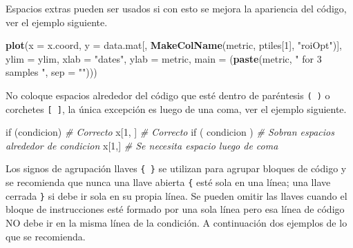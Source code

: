 \documentclass[10pt,]{krantz}
\makeatletter
\newenvironment{Shaded}{\begin{snugshade}}{\end{snugshade}}
\newcommand{\KeywordTok}[1]{\textcolor[rgb]{0.13,0.29,0.53}{\textbf{{#1}}}}
\newcommand{\DataTypeTok}[1]{\textcolor[rgb]{0.13,0.29,0.53}{{#1}}}
\newcommand{\DecValTok}[1]{\textcolor[rgb]{0.00,0.00,0.81}{{#1}}}
\newcommand{\StringTok}[1]{\textcolor[rgb]{0.31,0.60,0.02}{{#1}}}
\newcommand{\CommentTok}[1]{\textcolor[rgb]{0.56,0.35,0.01}{\textit{{#1}}}}
\newcommand{\NormalTok}[1]{{#1}}
\newenvironment{kframe}{%
\medskip{}
\setlength{\fboxsep}{.8em}
 \def\at@end@of@kframe{}%
 \ifinner\ifhmode%
  \def\at@end@of@kframe{\end{minipage}}%
  \begin{minipage}{\columnwidth}%
 \fi\fi%
 \def\FrameCommand##1{\hskip\@totalleftmargin \hskip-\fboxsep
 \colorbox{shadecolor}{##1}\hskip-\fboxsep
     \hskip-\linewidth \hskip-\@totalleftmargin \hskip\columnwidth}%
 \MakeFramed {\advance\hsize-\width
   \@totalleftmargin\z@ \linewidth\hsize
   \@setminipage}}%
 {\par\unskip\endMakeFramed%
 \at@end@of@kframe}
\renewenvironment{Shaded}{\begin{kframe}}{\end{kframe}}
\makeatother
\begin{document}
Espacios extras pueden ser usados si con esto se mejora la apariencia
del código, ver el ejemplo siguiente.

\begin{Shaded}
\begin{Highlighting}[]
\KeywordTok{plot}\NormalTok{(}\DataTypeTok{x    =} \NormalTok{x.coord,}
     \DataTypeTok{y    =} \NormalTok{data.mat[, }\KeywordTok{MakeColName}\NormalTok{(metric, ptiles[}\DecValTok{1}\NormalTok{], }\StringTok{"roiOpt"}\NormalTok{)],}
     \DataTypeTok{ylim =} \NormalTok{ylim,}
     \DataTypeTok{xlab =} \StringTok{"dates"}\NormalTok{,}
     \DataTypeTok{ylab =} \NormalTok{metric,}
     \DataTypeTok{main =} \NormalTok{(}\KeywordTok{paste}\NormalTok{(metric, }\StringTok{" for 3 samples "}\NormalTok{, }\DataTypeTok{sep =} \StringTok{""}\NormalTok{)))}
\end{Highlighting}
\end{Shaded}

No coloque espacios alrededor del código que esté dentro de paréntesis
\texttt{(\ )} o corchetes \texttt{{[}\ {]}}, la única excepción es luego
de una coma, ver el ejemplo siguiente.

\begin{Shaded}
\begin{Highlighting}[]
\NormalTok{if (condicion)    }\CommentTok{# Correcto }
\NormalTok{x[}\DecValTok{1}\NormalTok{, ]            }\CommentTok{# Correcto}
\NormalTok{if ( condicion )  }\CommentTok{# Sobran espacios alrededor de condicion}
\NormalTok{x[}\DecValTok{1}\NormalTok{,]             }\CommentTok{# Se necesita espacio luego de coma}
\end{Highlighting}
\end{Shaded}

Los signos de agrupación llaves \texttt{\{\ \}} se utilizan para agrupar
bloques de código y se recomienda que nunca una llave abierta
\texttt{\{} esté sola en una línea; una llave cerrada \texttt{\}} si
debe ir sola en su propia línea. Se pueden omitir las llaves cuando el
bloque de instrucciones esté formado por una sola línea pero esa línea
de código NO debe ir en la misma línea de la condición. A continuación
dos ejemplos de lo que se recomienda.
\end{document}
